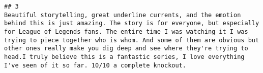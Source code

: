 \documentclass[
]{article}
\begin{document}
\begin{verbatim}
## 3                                                                                                                                                                                                                                                                                                                                                                                                                                                                                                                                                                                                                                                                                                                                                                                                                                                                                                                                                                                                                                                                                                                                                                                                                                                                                                                                                                                                                                                                                                                                                                                                                                                                                                                                                                                                                                                                                                                                                                                                                                                                                                                                                                                                                                                                                                                                                                                                                                                                                                                                                                                     Beautiful storytelling, great underline currents, and the emotion behind this is just amazing. The story is for everyone, but especially for League of Legends fans. The entire time I was watching it I was trying to piece together who is whom. And some of them are obvious but other ones really make you dig deep and see where they're trying to head.I truly believe this is a fantastic series, I love everything I've seen of it so far. 10/10 a complete knockout.

\end{verbatim}
\end{document}
